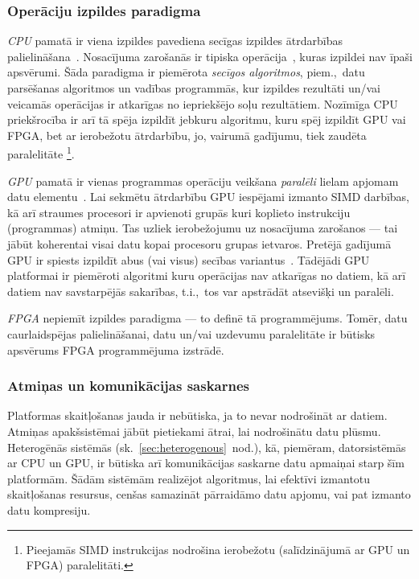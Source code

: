 \subsubsection*{Operāciju izpildes paradigma}
\emph{CPU} pamatā ir viena izpildes pavediena secīgas izpildes ātrdarbības
palielināšana~\cite{Owens-GPU}.
Nosacījuma zarošanās ir tipiska operācija~\cite{Flynn-arch}\cite{Patterson},
kuras izpildei nav īpaši apsvērumi.
Šāda paradigma ir piemērota \emph{secīgos algoritmos},
piem.,~datu parsēšanas algoritmos un vadības programmās,
kur izpildes rezultāti un/vai veicamās operācijas ir atkarīgas
no iepriekšējo soļu rezultātiem. Nozīmīga CPU priekšrocība ir arī tā spēja
izpildīt jebkuru algoritmu, kuru spēj izpildīt GPU vai FPGA, bet ar
ierobežotu ātrdarbību, jo, vairumā gadījumu, tiek zaudēta paralelitāte%
\footnote{Pieejamās SIMD instrukcijas nodrošina
	ierobežotu (salīdzinājumā ar GPU un FPGA) paralelitāti.}.

\emph{GPU} pamatā ir vienas programmas operāciju veikšana \emph{paralēli}
lielam apjomam
datu elementu~\cite{Fatahalian}\cite{Owens-GPU}.
Lai sekmētu ātrdarbību GPU iespējami izmanto SIMD darbības,
kā arī straumes procesori ir apvienoti grupās kuri koplieto instrukciju
(programmas) atmiņu. Tas uzliek ierobežojumu uz nosacījuma zarošanos ---
tai jābūt koherentai visai datu kopai procesoru grupas ietvaros. Pretējā
gadījumā GPU ir spiests izpildīt abus (vai visus) secības variantus~\cite{Owens-GPU}.
Tādējādi GPU platformai ir piemēroti algoritmi kuru operācijas nav atkarīgas no datiem,
kā arī datiem nav savstarpējās sakarības, t.i.,~tos var apstrādāt atsevišķi
un paralēli.

\emph{FPGA} nepiemīt izpildes paradigma --- to definē tā programmējums.
Tomēr, datu caurlaidspējas palielināšanai,
datu un/vai uzdevumu paralelitāte ir būtisks apsvērums
FPGA programmējuma izstrādē.

\subsubsection*{Atmiņas un komunikācijas saskarnes}
Platformas skaitļošanas jauda ir nebūtiska, ja to nevar nodrošināt ar datiem.
Atmiņas apakšsistēmai jābūt pietiekami ātrai, lai nodrošinātu datu plūsmu.
Heterogēnās sistēmās (sk.~\ref{sec:heterogenous}~nod.), kā, piemēram,
datorsistēmās ar CPU un GPU, ir būtiska arī komunikācijas saskarne datu
apmaiņai starp šīm platformām. Šādām sistēmām realizējot algoritmus,
lai efektīvi izmantotu skaitļošanas resursus, cenšas samazināt pārraidāmo
datu apjomu, vai pat izmanto datu kompresiju.
\cite{ACDA}\cite{OpenCL-book}

